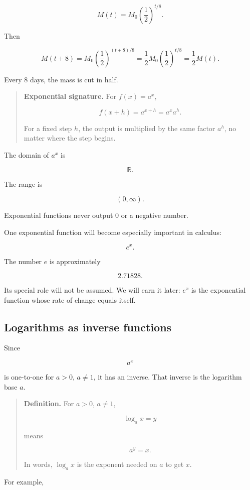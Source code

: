 \[
M(t)=M_0\left(\frac12\right)^{t/8}.
\]

Then

\[
M(t+8)
=
M_0\left(\frac12\right)^{(t+8)/8}
=
\frac12 M_0\left(\frac12\right)^{t/8}
=
\frac12 M(t).
\]

Every \(8\) days, the mass is cut in half.

\begin{quote}
\textbf{Exponential signature.}
For \(f(x)=a^x\),

\[
f(x+h)=a^{x+h}=a^x a^h.
\]

For a fixed step \(h\), the output is multiplied by the same factor \(a^h\), no matter where the step begins.
\end{quote}

The domain of \(a^x\) is

\[
\mathbb R.
\]

The range is

\[
(0,\infty).
\]

Exponential functions never output \(0\) or a negative number.

One exponential function will become especially important in calculus:

\[
e^x.
\]

The number \(e\) is approximately

\[
2.71828.
\]

Its special role will not be assumed. We will earn it later: \(e^x\) is the exponential function whose rate of change equals itself.

\subsection{Logarithms as inverse functions}
\label{subsec:logarithms-inverse-functions}

Since

\[
a^x
\]

is one-to-one for \(a>0\), \(a\neq1\), it has an inverse. That inverse is the logarithm base \(a\).

\begin{quote}
\textbf{Definition.}
For \(a>0\), \(a\neq1\),

\[
\log_a x=y
\]

means

\[
a^y=x.
\]

In words, \(\log_a x\) is the exponent needed on \(a\) to get \(x\).
\end{quote}

For example,

